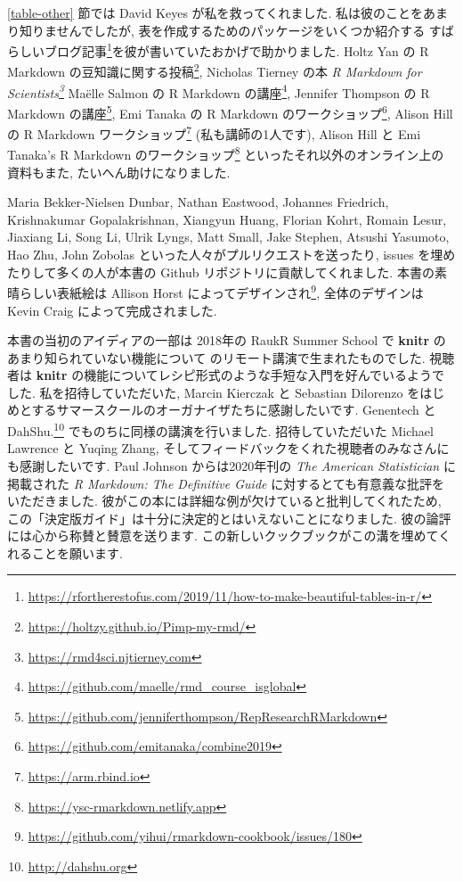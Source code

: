 \documentclass[
  11pt,
]{bxjsreport}
\renewcommand{\href}[2]{#2\footnote{\url{#1}}}
\begin{document}
\ref{table-other} 節では David Keyes が私を救ってくれました. 私は彼のことをあまり知りませんでしたが, 表を作成するためのパッケージをいくつか紹介する \href{https://rfortherestofus.com/2019/11/how-to-make-beautiful-tables-in-r/}{すばらしいブログ記事}を彼が書いていたおかげで助かりました. Holtz Yan の \href{https://holtzy.github.io/Pimp-my-rmd/}{R Markdown の豆知識に関する投稿}, Nicholas Tierney の本 \emph{\href{https://rmd4sci.njtierney.com}{R Markdown for Scientists}} Maëlle Salmon の \href{https://github.com/maelle/rmd_course_isglobal}{R Markdown の講座}, Jennifer Thompson の \href{https://github.com/jenniferthompson/RepResearchRMarkdown}{R Markdown の講座}, Emi Tanaka の \href{https://github.com/emitanaka/combine2019}{R Markdown のワークショップ}, Alison Hill の \href{https://arm.rbind.io}{R Markdown ワークショップ} (私も講師の1人です), Alison Hill と Emi Tanaka's \href{https://ysc-rmarkdown.netlify.app}{R Markdown のワークショップ} といったそれ以外のオンライン上の資料もまた, たいへん助けになりました.

Maria Bekker-Nielsen Dunbar, Nathan Eastwood, Johannes Friedrich, Krishnakumar Gopalakrishnan, Xiangyun Huang, Florian Kohrt, Romain Lesur, Jiaxiang Li, Song Li, Ulrik Lyngs, Matt Small, Jake Stephen, Atsushi Yasumoto, Hao Zhu, John Zobolas といった人々がプルリクエストを送ったり, issues を埋めたりして多くの人が本書の Github リポジトリに貢献してくれました. 本書の素晴らしい表紙絵は \href{https://github.com/yihui/rmarkdown-cookbook/issues/180}{Allison Horst によってデザインされ}, 全体のデザインは Kevin Craig によって完成されました.

本書の当初のアイディアの一部は 2018年の RaukR Summer School で \textbf{knitr} のあまり知られていない機能について のリモート講演で生まれたものでした. 視聴者は \textbf{knitr} の機能についてレシピ形式のような手短な入門を好んでいるようでした. 私を招待していただいた, Marcin Kierczak と Sebastian Dilorenzo をはじめとするサマースクールのオーガナイザたちに感謝したいです. Genentech と \href{http://dahshu.org}{DahShu.} でものちに同様の講演を行いました. 招待していただいた Michael Lawrence と Yuqing Zhang, そしてフィードバックをくれた視聴者のみなさんにも感謝したいです. Paul Johnson からは2020年刊の \emph{The American Statistician} に掲載された \emph{R Markdown: The Definitive Guide} に対するとても有意義な批評をいただきました. 彼がこの本には詳細な例が欠けていると批判してくれたため, この「決定版ガイド」は十分に決定的とはいえないことになりました. 彼の論評には心から称賛と賛意を送ります. この新しいクックブックがこの溝を埋めてくれることを願います.
\end{document}
